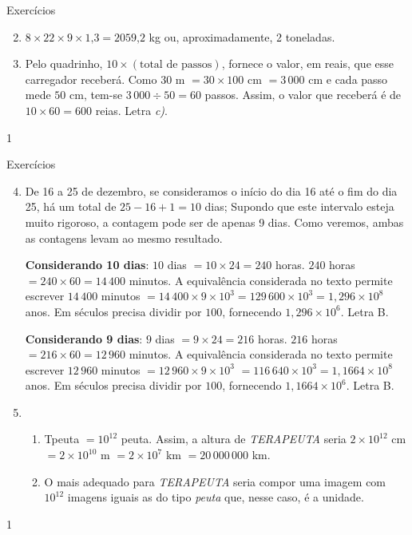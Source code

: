 \begin{answer}{Exercícios}
{\exerciselist
\begin{enumerate}\setcounter{enumi}{1}
\item \(8 \times 22 \times 9 \times 1\text{,}3 = 2059\text{,}2\) kg ou, aproximadamente, 2 toneladas.

\item Pelo quadrinho, \(10 \times (\text{total de passos})\), fornece o valor, em reais, que esse carregador receberá. Como \(30\) m \(= 30 \times 100\) cm \(=3\, 000\) cm e cada passo mede \(50\) cm, tem-se \(3\, 000 \div 50 = 60\) passos. Assim, o valor que receberá é de \(10\times 60 = 600\) reias. Letra \textit{c)}.
\end{enumerate}
}{1}
\end{answer}
\clearmargin

\begin{answer}{Exercícios}
{\exerciselist
\begin{enumerate}\setcounter{enumi}{3}
\item De 16 a 25 de dezembro, se consideramos o início do dia 16 até o fim do dia 25, há um total de \(25 - 16 + 1 = 10\) dias; Supondo que este intervalo esteja muito rigoroso, a contagem pode ser de apenas 9 dias. Como veremos, ambas as contagens levam ao mesmo resultado.

\textbf{Considerando 10 dias}: \(10\) dias \(= 10\times 24=240\) horas. \(240\) horas \(= 240 \times 60 = 14\,400\) minutos. A equivalência considerada no texto permite escrever \(14\,400\) minutos \(= 14\,400 \times 9 \times 10^3 =129\,600 \times 10^3 = 1,296 \times 10^8\) anos. Em séculos precisa dividir por \(100\), fornecendo \(1,296 \times 10^6\). Letra B.

\textbf{Considerando 9 dias}: \(9\) dias \(= 9\times 24 = 216\) horas. \(216\) horas \(=216\times 60 = 12\,960\) minutos. A equivalência considerada no texto permite escrever \(12\,960\) minutos \(= 12\,960 \times 9 \times 10^3\) \(=116\,640 \times 10^3 = 1,1664 \times 10^8\) anos. Em séculos precisa dividir por \(100\), fornecendo \(1,1664 \times 10^6\). Letra B.

\item 
\begin{enumerate}
\item Tpeuta \(= 10^{12}\) peuta. Assim, a altura de \textit{TERAPEUTA} seria \(2 \times 10^{12}\) cm \(= 2 \times 10^{10}\) m \(= 2 \times 10^7\) km \(= 20\,000\,000\) km.

\item O mais adequado para \textit{TERAPEUTA} seria compor uma imagem com \(10^{12}\) imagens iguais as do tipo \textit{peuta} que, nesse caso, é a unidade.
\end{enumerate}
\end{enumerate}
}{1}
\end{answer}
\clearmargin

